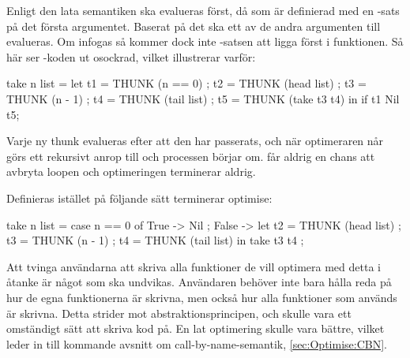 \documentclass[../Optimise]{subfiles}
\begin{document}
Enligt den lata semantiken ska  evalueras först, då 
 som är definierad med en -sats på det första argumentet.
Baserat på det ska ett av de andra argumenten till   evalueras. 
Om  infogas så kommer dock inte -satsen att ligga först i funktionen. 
Så här ser -koden ut osockrad, vilket illustrerar varför:

\begin{codeEx}
take n list = let 
    { t1 = THUNK (n == 0)
    ; t2 = THUNK (head list)
    ; t3 = THUNK (n - 1)
    ; t4 = THUNK (tail list)
    ; t5 = THUNK (take t3 t4)
    } in  if t1 Nil t5;
\end{codeEx}

Varje ny thunk evalueras efter att den har passerats, och när optimeraren når 
 görs ett rekursivt anrop till  och processen börjar om.
 får aldrig en chans att avbryta loopen och optimeringen terminerar aldrig.

Definieras  istället på följande sätt terminerar optimise:

\begin{codeEx}
take n list = case n == 0 of
    { True -> Nil
    ; False -> let 
        { t2 = THUNK (head list)
        ; t3 = THUNK (n - 1)
        ; t4 = THUNK (tail list)
        } in  take t3 t4
    };
\end{codeEx}


Att tvinga användarna att skriva alla funktioner
de vill optimera med detta i åtanke är något som ska undvikas.
 Användaren behöver inte bara hålla reda på 
hur de egna funktionerna är skrivna, men också hur alla funktioner som används är skrivna. 
Detta strider mot abstraktionsprincipen, och skulle vara ett omständigt sätt
 att skriva kod på. 
En lat optimering skulle vara bättre, vilket leder in till kommande avsnitt om
call-by-name-semantik, \ref{sec:Optimise:CBN}.
\end{document}
